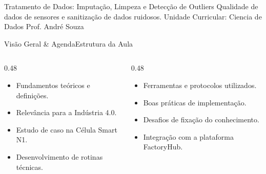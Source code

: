 
\senaicover
  {Tratamento de Dados: Imputação, Limpeza e Detecção de Outliers}
  {Qualidade de dados de sensores e sanitização de dados ruidosos.}
  {Unidade Curricular: Ciencia de Dados}
  {Prof. André Souza}

\begin{senaiframe}{Visão Geral \& Agenda}{Estrutura da Aula}
  \begin{columns}[t]
    \begin{column}{0.48\textwidth}
      \begin{tcolorbox}[senaibluecard, title={1. Conceitos Chave}]
        \begin{itemize}
          \item Fundamentos teóricos e definições.
          \item Relevância para a Indústria 4.0.
        \end{itemize}
      \end{tcolorbox}
      \vspace{4pt}
      \begin{tcolorbox}[senaiambercard, title={3. Aplicação Prática}]
        \begin{itemize}
          \item Estudo de caso na Célula Smart N1.
          \item Desenvolvimento de rotinas técnicas.
        \end{itemize}
      \end{tcolorbox}
    \end{column}
    \begin{column}{0.48\textwidth}
      \begin{tcolorbox}[senairedcard, title={2. Detalhamento Técnico}]
        \begin{itemize}
          \item Ferramentas e protocolos utilizados.
          \item Boas práticas de implementação.
        \end{itemize}
      \end{tcolorbox}
      \vspace{4pt}
      \begin{tcolorbox}[senaigreencard, title={4. Exercícios \& Avaliação}]
        \begin{itemize}
          \item Desafios de fixação do conhecimento.
          \item Integração com a plataforma FactoryHub.
        \end{itemize}
      \end{tcolorbox}
    \end{column}
  \end{columns}
\end{senaiframe}


